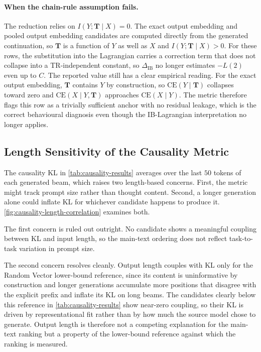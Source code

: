 \paragraph{When the chain-rule assumption fails.} The reduction relies on $I(Y; \mathbf{T} \mid X) = 0$. The exact output embedding and pooled output embedding candidates are computed directly from the generated continuation, so $\mathbf{T}$ is a function of $Y$ as well as $X$ and $I(Y; \mathbf{T} \mid X) > 0$. For these rows, the substitution into the Lagrangian carries a correction term that does not collapse into a TR-independent constant, so $\Delta_{\text{IB}}$ no longer estimates $-L(2)$ even up to $C$. The reported value still has a clear empirical reading. For the exact output embedding, $\mathbf{T}$ contains $Y$ by construction, so $\text{CE}(Y \mid \mathbf{T})$ collapses toward zero and $\text{CE}(X \mid Y, \mathbf{T})$ approaches $\text{CE}(X \mid Y)$. The metric therefore flags this row as a trivially sufficient anchor with no residual leakage, which is the correct behavioural diagnosis even though the IB-Lagrangian interpretation no longer applies.

\subsection{Length Sensitivity of the Causality Metric}
\label{appendix:causality_length}

The causality KL in \cref{tab:causality-results} averages over the last $50$ tokens of each generated beam, which raises two length-based concerns. First, the metric might track prompt size rather than thought content. Second, a longer generation alone could inflate KL for whichever candidate happens to produce it. \cref{fig:causality-length-correlation} examines both.

The first concern is ruled out outright. No candidate shows a meaningful coupling between KL and input length, so the main-text ordering does not reflect task-to-task variation in prompt size.

The second concern resolves cleanly. Output length couples with KL only for the Random Vector lower-bound reference, since its content is uninformative by construction and longer generations accumulate more positions that disagree with the explicit prefix and inflate its KL on long beams. The candidates clearly below this reference in \cref{tab:causality-results} show near-zero coupling, so their KL is driven by representational fit rather than by how much the source model chose to generate. Output length is therefore not a competing explanation for the main-text ranking but a property of the lower-bound reference against which the ranking is measured.

